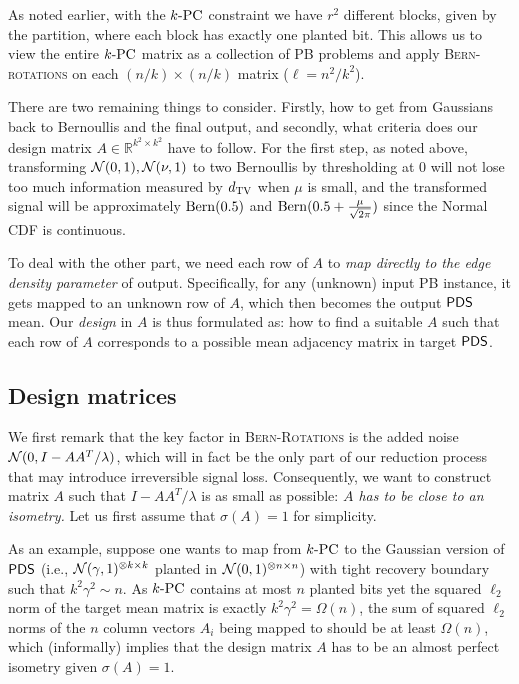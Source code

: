 \documentclass[final,12pt]{colt2023} %
\newcommand\1[1]{\mathbb{I}_{\left\{#1\right\}}}
\begin{document}
As noted earlier, with the $k\textup{-PC}$ constraint we have $r^2$ different blocks, given by the partition, where each block has exactly one planted bit. This allows us to view the entire $k\textup{-PC}$ matrix as a collection of PB problems and apply \textsc{Bern-rotations} on each $(n/k) \times (n/k) $ matrix ($\ell=n^2/k^2$).

There are two remaining things to consider. Firstly, how to get from Gaussians back to Bernoullis and the final output, and secondly, what criteria does our design matrix $A\in\mathbb{R}^{k^2\times k^2}$ have to follow. For the first step, as noted above, transforming $\mathcal{N}(0, 1), \mathcal{N}(\nu, 1)$ to two Bernoullis by thresholding at 0 will not lose too much information measured by $d_{\rm TV}$ when $\mu$ is small, and the transformed signal will be approximately ${\rm Bern}(0.5)$ and ${\rm Bern}(0.5+\frac{\mu}{\sqrt{2\pi}})$ since the Normal CDF is continuous. 

To deal with the other part, we need each row of $A$ to \emph{map directly to the edge density parameter} of output. Specifically, for any (unknown) input PB instance, it gets mapped to an unknown row of $A$, which then becomes the output $\mathsf{PDS}$ mean. Our \emph{design} in $A$ is thus formulated as: how to find a suitable $A$ such that each row of $A$ corresponds to a possible mean adjacency matrix in target $\mathsf{PDS}$.

\subsection{Design matrices}
We first remark that the key factor in \textsc{Bern-Rotations} is the added noise $\mathcal{N}(0, I-AA^T/\lambda)$, which will in fact be the only part of our reduction process that may introduce irreversible signal loss. Consequently, we want to construct matrix $A$ such that $I-AA^T/\lambda$ is as small as possible: \emph{$A$ has to be close to an isometry.} Let us first assume that $\sigma(A)=1$ for simplicity.

As an example, suppose one wants to map from $k\textup{-PC}$ to the Gaussian version of $\mathsf{PDS}$ (i.e., $\mathcal{N}(\gamma, 1)^{\otimes k\times k}$ planted in $\mathcal{N}(0, 1)^{\otimes n\times n}$) with tight recovery boundary  such that $k^2\gamma^2\sim n$. As $k\textup{-PC}$ contains at most ${n}$ planted bits yet the squared $\ell_2$ norm of the target mean matrix is exactly $k^2\gamma^2=\Omega (n)$, the sum of squared $\ell_2$ norms of the $n$ column vectors $A_i$ being mapped to should be at least $\Omega(n)$, which (informally) implies that the design matrix $A$ has to be an almost perfect isometry given $\sigma(A)=1$. 
\end{document}
